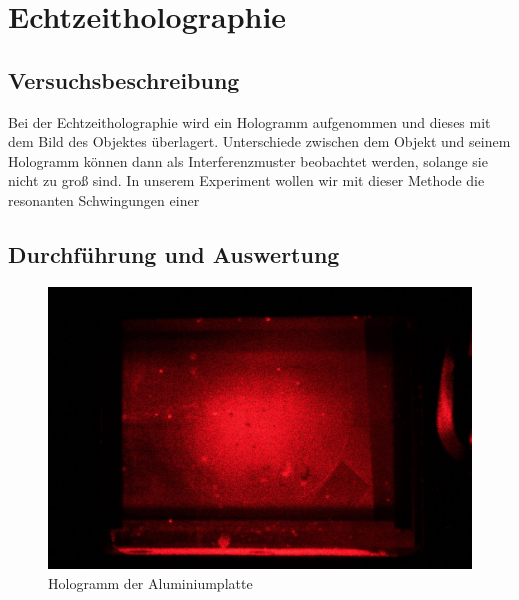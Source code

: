 \section{Echtzeitholographie}
\subsection{Versuchsbeschreibung}
Bei der Echtzeitholographie wird ein Hologramm aufgenommen und dieses mit dem Bild des Objektes überlagert. Unterschiede zwischen dem Objekt und seinem Hologramm können dann als Interferenzmuster beobachtet werden, solange sie nicht zu groß sind. In unserem Experiment wollen wir mit dieser Methode die resonanten Schwingungen einer 
\subsection{Durchführung und Auswertung}

\begin{figure}[ht]
 \includegraphics[width=\textwidth]{Photos/IMG_3927.jpg}
 \caption{Hologramm der Aluminiumplatte}
\end{figure}


